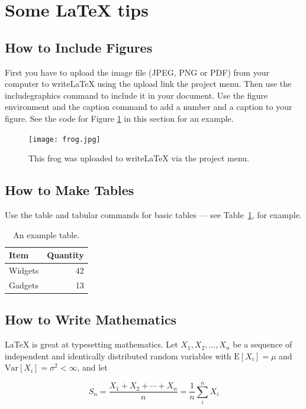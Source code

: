\documentclass[a4paper]{article}
\begin{document}
\newpage
\section{Some LaTeX tips}
\label{sec:latex}
\subsection{How to Include Figures}

First you have to upload the image file (JPEG, PNG or PDF) from your computer to writeLaTeX using the upload link the project menu. Then use the includegraphics command to include it in your document. Use the figure environment and the caption command to add a number and a caption to your figure. See the code for Figure \ref{fig:frog} in this section for an example.

\begin{figure}
\centering
\texttt{[image: frog.jpg]}
\caption{\label{fig:frog}This frog was uploaded to writeLaTeX via the project menu.}
\end{figure}

\subsection{How to Make Tables}

Use the table and tabular commands for basic tables --- see Table~\ref{tab:widgets}, for example.

\begin{table}
\centering
\begin{tabular}{l|r}
Item & Quantity \\\hline
Widgets & 42 \\
Gadgets & 13
\end{tabular}
\caption{\label{tab:widgets}An example table.}
\end{table}

\subsection{How to Write Mathematics}

\LaTeX{} is great at typesetting mathematics. Let $X_1, X_2, \ldots, X_n$ be a sequence of independent and identically distributed random variables with $\text{E}[X_i] = \mu$ and $\text{Var}[X_i] = \sigma^2 < \infty$, and let

\begin{equation}
S_n = \frac{X_1 + X_2 + \cdots + X_n}{n}
      = \frac{1}{n}\sum_{i}^{n} X_i
\label{eq:sn}
\end{equation}
\end{document}
